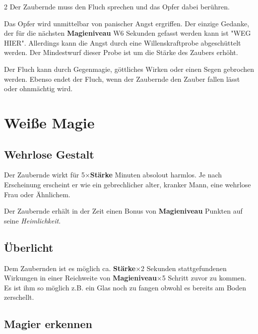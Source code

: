 \begin{multicols*}{2}
Der Zaubernde muss den Fluch sprechen und das Opfer dabei berühren.

Das Opfer wird unmittelbar von panischer Angst ergriffen. Der einzige Gedanke, der für die nächsten \textbf{Magieniveau} W6 Sekunden gefasst werden kann ist "WEG HIER". Allerdings kann die Angst durch eine Willenskraftprobe abgeschüttelt werden. Der Mindestwurf dieser Probe ist um die Stärke des Zaubers erhöht.

Der Fluch kann durch Gegenmagie, göttliches Wirken oder einen Segen gebrochen werden. Ebenso endet der Fluch, wenn der Zaubernde den Zauber fallen lässt oder ohnmächtig wird.



\section{Weiße Magie}

\subsection{Wehrlose Gestalt}

Der Zaubernde wirkt für 5×\textbf{Stärke} Minuten absolout harmlos. Je nach Erscheinung erscheint er wie ein gebrechlicher alter, kranker Mann, eine wehrlose Frau oder Ähnlichem.

Der Zaubernde erhält in der Zeit einen Bonus von \textbf{Magieniveau} Punkten auf seine \textit{Heimlichkeit}.



\subsection{Überlicht}

Dem Zaubernden ist es möglich ca. \textbf{Stärke}×2 Sekunden stattgefundenen Wirkungen in einer Reichweite von \textbf{Magieniveau}×5 Schritt zuvor zu kommen. Es ist ihm so möglich z.B. ein Glas noch zu fangen obwohl es bereits am Boden zerschellt.



\subsection{Magier erkennen}


\end{multicols*}
